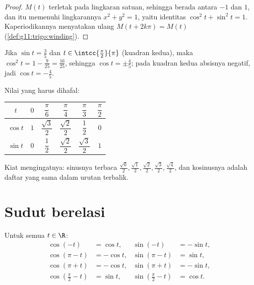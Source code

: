 \begin{proof}
$M(t)$ terletak pada lingkaran satuan, sehingga  berada antara
$-1$ dan $1$, dan  itu memenuhi  lingkarannya
$x^2 + y^2 = 1$, yaitu identitas $\cos^2 t + \sin^2 t = 1$. Kaperiodikannya
menyatakan ulang $M(t + 2k\pi) = M(t)$ (\cref{def:g11:trigo:winding}).
\end{proof}

\begin{example}\label{ex:g11:trigo:identity}
Jika $\sin t = \frac35$ dan $t \in \intcc{\frac\pi2}{\pi}$ (kuadran
kedua), maka $\cos^2 t = 1 - \frac{9}{25} = \frac{16}{25}$, sehingga
$\cos t = \pm\frac45$; pada kuadran kedua absisnya negatif,
jadi $\cos t = -\frac45$.
\end{example}

Nilai yang harus dihafal:
\begin{center}
\begin{tabular}{c|ccccc}
$t$ & $0$ & $\dfrac{\pi}{6}$ & $\dfrac{\pi}{4}$ & $\dfrac{\pi}{3}$ & $\dfrac{\pi}{2}$\\[6pt]
\hline\rule{0pt}{14pt}%
$\cos t$ & $1$ & $\dfrac{\sqrt3}{2}$ & $\dfrac{\sqrt2}{2}$ & $\dfrac12$ & $0$\\[6pt]
$\sin t$ & $0$ & $\dfrac12$ & $\dfrac{\sqrt2}{2}$ & $\dfrac{\sqrt3}{2}$ & $1$
\end{tabular}
\end{center}

\begin{remark}
Kiat mengingatnya: sinusnya terbaca
$\frac{\sqrt0}{2}, \frac{\sqrt1}{2}, \frac{\sqrt2}{2}, \frac{\sqrt3}{2},
\frac{\sqrt4}{2}$, dan kosinusnya adalah daftar yang sama dalam urutan terbalik.
\end{remark}

\section{Sudut berelasi}

\begin{proposition}\label{prop:g11:trigo:associated}
Untuk semua $t \in \R$:
\[
\begin{aligned}
\cos(-t) &= \cos t, & \sin(-t) &= -\sin t,\\
\cos(\pi - t) &= -\cos t, & \sin(\pi - t) &= \sin t,\\
\cos(\pi + t) &= -\cos t, & \sin(\pi + t) &= -\sin t,\\
\cos\left(\tfrac{\pi}{2} - t\right) &= \sin t, &
\sin\left(\tfrac{\pi}{2} - t\right) &= \cos t .
\end{aligned}
\]
\end{proposition}

